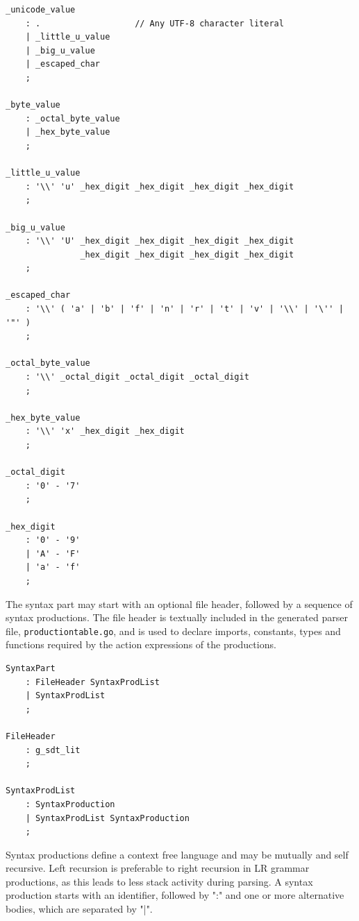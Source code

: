 \documentclass[12pt]{article}
\begin{document}
\begin{Verbatim}[frame=single]
_unicode_value
    : .                   // Any UTF-8 character literal
    | _little_u_value
    | _big_u_value
    | _escaped_char
    ;

_byte_value
    : _octal_byte_value
    | _hex_byte_value
    ;

_little_u_value
    : '\\' 'u' _hex_digit _hex_digit _hex_digit _hex_digit
    ;

_big_u_value
    : '\\' 'U' _hex_digit _hex_digit _hex_digit _hex_digit
               _hex_digit _hex_digit _hex_digit _hex_digit
    ;

_escaped_char
    : '\\' ( 'a' | 'b' | 'f' | 'n' | 'r' | 't' | 'v' | '\\' | '\'' | '"' )
    ;

_octal_byte_value
    : '\\' _octal_digit _octal_digit _octal_digit
    ;

_hex_byte_value
    : '\\' 'x' _hex_digit _hex_digit
    ;

_octal_digit
    : '0' - '7'
    ;

_hex_digit
    : '0' - '9'
    | 'A' - 'F'
    | 'a' - 'f'
    ;
\end{Verbatim}

The syntax part may start with an optional file header, followed by a sequence of syntax productions. The file header is textually included in the generated parser file, \verb|productiontable.go|, and is used to declare imports, constants, types and functions required by the action expressions of the productions.

\begin{Verbatim}[frame=single]
SyntaxPart
    : FileHeader SyntaxProdList
    | SyntaxProdList
    ;

FileHeader
    : g_sdt_lit
    ;

SyntaxProdList
    : SyntaxProduction
    | SyntaxProdList SyntaxProduction
    ;
\end{Verbatim}

Syntax productions define a context free language and may be mutually and self recursive. Left recursion is preferable to right recursion in LR grammar productions, as this leads to less stack activity during parsing. A syntax production starts with an identifier, followed by ":" and one or more alternative bodies, which are separated by "|".
\end{document}
